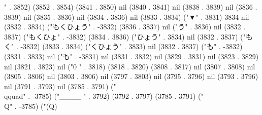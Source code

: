 {" . 3852) (3852 . 3854) (3841 . 3850) nil (3840 . 3841) nil (3838 . 3839) nil (3836 . 3839) nil (3835 . 3836) nil (3834 . 3836) nil (3833 . 3834) ("▼" . 3831) 3834 nil (3832 . 3834) ("もくひょう" . -3832) (3836 . 3837) nil ("う" . 3836) nil (3832 . 3837) ("もくひょ" . -3832) (3834 . 3836) ("ひょう" . 3834) nil (3832 . 3837) ("もく" . -3832) (3833 . 3834) ("くひょう" . 3833) nil (3832 . 3837) ("も" . -3832) (3831 . 3833) nil ("も" . -3831) nil (3831 . 3832) nil (3829 . 3831) nil (3823 . 3829) nil (3821 . 3823) nil ("0
" . 3818) (3818 . 3820) (3808 . 3817) nil (3807 . 3808) nil (3805 . 3806) nil (3803 . 3806) nil (3797 . 3803) nil (3795 . 3796) nil (3793 . 3796) nil (3791 . 3793) nil (3785 . 3791) ("\\qquad" . -3785) ("____
" . 3792) (3792 . 3797) (3785 . 3791) ("\\Q" . -3785) ("(Q)
}

